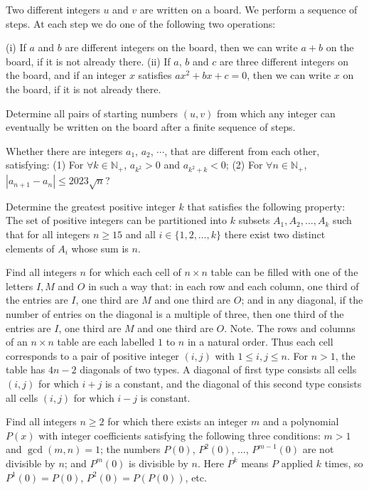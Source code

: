 \documentclass[11pt]{scrartcl}
\begin{document}
\begin{problem}[7710975676761169567]
Two different integers $u$ and $v$ are written on a board. We perform a sequence of steps. At each step we do one of the following two operations:

(i) If $a$ and $b$ are different integers on the board, then we can write $a + b$ on the board, if it is not
already there.
(ii) If $a$, $b$ and $c$ are three different integers on the board, and if an integer $x$ satisfies $ax^2 +bx+c = 0$,
then we can write $x$ on the board, if it is not already there.

Determine all pairs of starting numbers $(u, v)$ from which any integer can eventually be written on the board after a finite sequence of steps.
\end{problem}
\begin{problem}[7741197987988527254]
	Whether there are integers $a_1$, $a_2$, $\cdots$, that are different from each other, satisfying:
(1) For $\forall k\in\mathbb N_+$, $a_{k^2}>0$ and $a_{k^2+k}<0$;
(2) For $\forall n\in\mathbb N_+$, $\left| a_{n+1}-a_n\right|\leqslant 2023\sqrt n$?
\end{problem}
\begin{problem}[7796424663887996427]
Determine the greatest positive integer $k$ that satisfies the following property: The set of positive integers can be partitioned into $k$ subsets $A_1, A_2, \ldots, A_k$ such that for all integers $n \geq 15$ and all $i \in \{1, 2, \ldots, k\}$ there exist two distinct elements of $A_i$ whose sum is $n.$
\end{problem}
\begin{problem}[7902258516875436315]
Find all integers $n$ for which each cell of $n \times n$ table can be filled with one of the letters $I,M$ and $O$ in such a way that:
in each row and each column, one third of the entries are $I$, one third are $M$ and one third are $O$; and 
in any diagonal, if the number of entries on the diagonal is a multiple of three, then one third of the entries are $I$, one third are $M$ and one third are $O$.
Note. The rows and columns of an $n \times n$ table are each labelled $1$ to $n$ in a natural order. Thus each cell corresponds to a pair of positive integer $(i,j)$ with $1 \le i,j \le n$. For $n>1$, the table has $4n-2$ diagonals of two types. A diagonal of first type consists all cells $(i,j)$ for which $i+j$ is a constant, and the diagonal of this second type consists all cells $(i,j)$ for which $i-j$ is constant.
\end{problem}
\begin{problem}[7904897494032012729]
Find all integers $n \ge 2$ for which there exists an integer $m$ and a polynomial $P(x)$ with integer coefficients satisfying the following three conditions:
$m > 1$ and $\gcd(m,n) = 1$;
the numbers $P(0)$, $P^2(0)$, $\ldots$, $P^{m-1}(0)$ are not divisible by $n$; and
$P^m(0)$ is divisible by $n$.
Here $P^k$ means $P$ applied $k$ times, so $P^1(0) = P(0)$, $P^2(0) = P(P(0))$, etc.
\end{problem}
\end{document}
